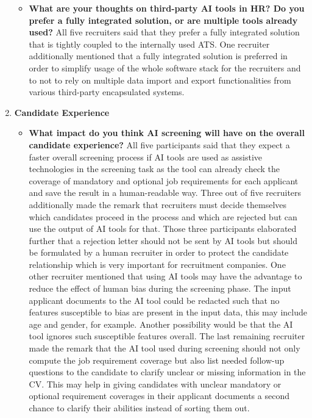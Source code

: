 \documentclass[draft,final]{thesisclass} %
\begin{document}
\begin{enumerate}
\begin{itemize}
        \item \textbf{What are your thoughts on third-party \acs{AI} tools in HR? Do you prefer a fully integrated solution, or are multiple tools already used?}
        All five recruiters said that they prefer a fully integrated solution that is tightly coupled to the internally used \acs{ATS}.
        One recruiter additionally mentioned that a fully integrated solution is preferred in order to simplify usage of the whole software stack for the recruiters and to not to rely on multiple data import and export functionalities from various third-party encapsulated systems.
    \end{itemize}
    \item \textbf{Candidate Experience} \label{candidate_experience}
    \begin{itemize}
        \item \textbf{What impact do you think \acs{AI} screening will have on the overall candidate experience?}
        All five participants said that they expect a faster overall screening process if \acs{AI} tools are used as assistive technologies in the screening task as the tool can already check the coverage of mandatory and optional job requirements for each applicant and save the result in a human-readable way. Three out of five recruiters additionally made the remark that recruiters must decide themselves which candidates proceed in the process and which are rejected but can use the output of \acs{AI} tools for that. Those three participants elaborated further that a rejection letter should not be sent by \acs{AI} tools but should be formulated by a human recruiter in order to protect the candidate relationship which is very important for recruitment companies. One other recruiter mentioned that using \acs{AI} tools may have the advantage to reduce the effect of human bias during the screening phase. The input applicant documents to the \acs{AI} tool could be redacted such that no features susceptible to bias are present in the input data, this may include age and gender, for example. Another possibility would be that the \acs{AI} tool ignores such susceptible features overall. The last remaining recruiter made the remark that the \acs{AI} tool used during screening should not only compute the job requirement coverage but also list needed follow-up questions to the candidate to clarify unclear or missing information in the \acs{CV}. This may help in giving candidates with unclear mandatory or optional requirement coverages in their applicant documents a second chance to clarify their abilities instead of sorting them out.

\end{itemize}
\end{enumerate}
\end{document}
